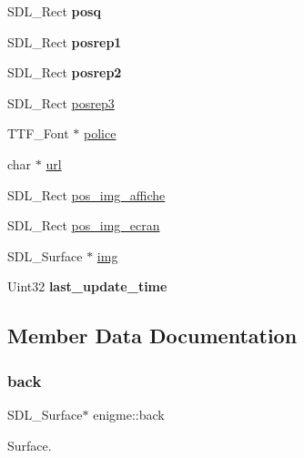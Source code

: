 \begin{DoxyCompactItemize}
\mbox{\label{structenigme_a7af260f39d1c55267e92bf748c1da99d}} 
S\+D\+L\+\_\+\+Rect {\bfseries posq}
\item 
\mbox{\label{structenigme_aa41e1287b7583b5440bc32d04660c5e5}} 
S\+D\+L\+\_\+\+Rect {\bfseries posrep1}
\item 
\mbox{\label{structenigme_ad6b7b05138ce5157e260cad0d1407271}} 
S\+D\+L\+\_\+\+Rect {\bfseries posrep2}
\item 
S\+D\+L\+\_\+\+Rect \hyperlink{structenigme_a60c28357556d408ee26664adf0a34604}{posrep3}
\item 
T\+T\+F\+\_\+\+Font $\ast$ \hyperlink{structenigme_a63ffe54c589cabf303d7240afec104e5}{police}
\item 
char $\ast$ \hyperlink{structenigme_a517b1827214ab22f8641f6393d3dbbaf}{url}
\item 
S\+D\+L\+\_\+\+Rect \hyperlink{structenigme_a8f92e5a5d5a601e895af598155a379d6}{pos\+\_\+img\+\_\+affiche}
\item 
S\+D\+L\+\_\+\+Rect \hyperlink{structenigme_a71f8472fe2bc1d2e9d56776260f84230}{pos\+\_\+img\+\_\+ecran}
\item 
S\+D\+L\+\_\+\+Surface $\ast$ \hyperlink{structenigme_ac5c2141e5f8c366ff16d1fad83ee3e54}{img}
\item 
\mbox{\label{structenigme_aafb9bee68ca3f1ac428443a7aae96105}} 
Uint32 {\bfseries last\+\_\+update\+\_\+time}
\end{DoxyCompactItemize}


\subsection{Member Data Documentation}
\mbox{\label{structenigme_a6a286d6b979d539407e5d14c4638e185}} 
\subsubsection{\texorpdfstring{back}{back}}
{\footnotesize\ttfamily S\+D\+L\+\_\+\+Surface$\ast$ enigme\+::back}

Surface. \mbox{\label{structenigme_ae4115f43f989eaddab7c5df8df520c4c}} 
